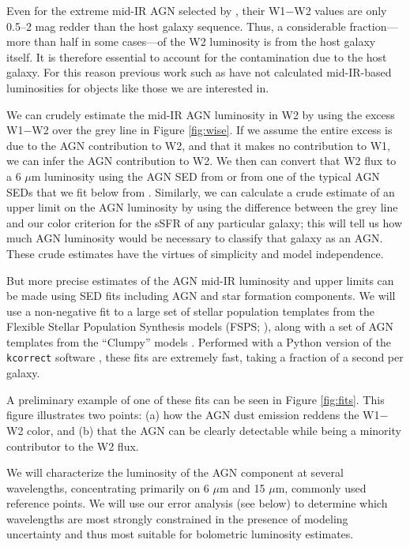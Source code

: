 \documentclass[12pt, preprint]{hacked-aastex}
\begin{document}
Even for the extreme mid-IR AGN selected by \cite{assef18a}, their
W1$-$W2 values are only 0.5--2 mag redder than the host galaxy
sequence. Thus, a considerable fraction---more than half in some
cases---of the W2 luminosity is from the host galaxy itself. It is
therefore essential to account for the contamination due to the host
galaxy. For this reason previous work such as \cite{hviding22a} have
not calculated mid-IR-based luminosities for objects like those
we are interested in.  

We can crudely estimate the mid-IR AGN luminosity in W2 by using the
excess W1$-$W2 over the grey line in Figure \ref{fig:wise}.  If we
assume the entire excess is due to the AGN contribution to W2, and
that it makes no contribution to W1, we can infer the AGN contribution
to W2. We then can convert that W2 flux to a 6 $\mu$m luminosity using
the AGN SED from \cite{richards06a} or from one of the typical AGN
SEDs that we fit below from \cite{nenkova08a}.  Similarly, we can
calculate a crude estimate of an upper limit on the AGN luminosity by
using the difference between the grey line and our color criterion for
the sSFR of any particular galaxy; this will tell us how much AGN
luminosity would be necessary to classify that galaxy as an AGN.
These crude estimates have the virtues of simplicity and model
independence.

But more precise estimates of the AGN mid-IR luminosity and upper
limits can be made using SED fits including AGN and star formation
components. We will use a non-negative fit to a large set of stellar
population templates from the Flexible Stellar Population Synthesis
models (FSPS; \cite{conroy09a}), along with a set of AGN templates
from the ``Clumpy'' models \cite{nenkova08a}.  Performed with a Python
version of the {\tt kcorrect} software \cite{blanton07a}, these fits
are extremely fast, taking a fraction of a second per galaxy.

A preliminary example of one of these fits can be seen in Figure
\ref{fig:fits}. This figure illustrates two points: (a) how the AGN
dust emission reddens the W1$-$W2 color, and (b) that the AGN can be
clearly detectable while being a minority contributor to the W2
flux.

We will characterize the luminosity of the AGN component at several
wavelengths, concentrating primarily on 6 $\mu$m and 15 $\mu$m, 
commonly used reference points. We will use our error analysis (see 
below) to determine which wavelengths are most strongly constrained
in the presence of modeling uncertainty and thus most suitable for 
bolometric luminosity estimates. 
\end{document}
